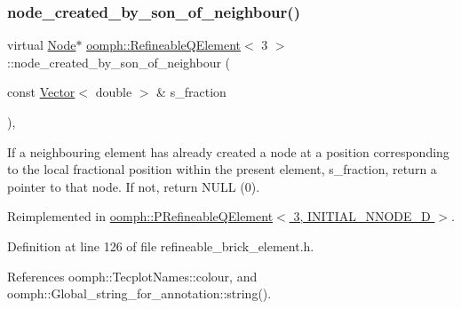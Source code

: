\mbox{\label{classoomph_1_1RefineableQElement_3_013_01_4_aab54b116a277372d4af7d7c93301ecda}} 
\subsubsection{\texorpdfstring{node\+\_\+created\+\_\+by\+\_\+son\+\_\+of\+\_\+neighbour()}{node\_created\_by\_son\_of\_neighbour()}}
{\footnotesize\ttfamily virtual \hyperlink{classoomph_1_1Node}{Node}$\ast$ \hyperlink{classoomph_1_1RefineableQElement}{oomph\+::\+Refineable\+Q\+Element}$<$ 3 $>$\+::node\+\_\+created\+\_\+by\+\_\+son\+\_\+of\+\_\+neighbour (\begin{DoxyParamCaption}\item[{const \hyperlink{classoomph_1_1Vector}{Vector}$<$ double $>$ \&}]{s\+\_\+fraction }\end{DoxyParamCaption})\hspace{0.3cm}{\ttfamily [inline]}, {\ttfamily [virtual]}}



If a neighbouring element has already created a node at a position corresponding to the local fractional position within the present element, s\+\_\+fraction, return a pointer to that node. If not, return N\+U\+LL (0). 



Reimplemented in \hyperlink{classoomph_1_1PRefineableQElement_3_013_00_01INITIAL__NNODE__1D_01_4_aee94f17bdc0cf3de22308e57121866dd}{oomph\+::\+P\+Refineable\+Q\+Element$<$ 3, I\+N\+I\+T\+I\+A\+L\+\_\+\+N\+N\+O\+D\+E\+\_\+D $>$}.



Definition at line 126 of file refineable\+\_\+brick\+\_\+element.\+h.



References oomph\+::\+Tecplot\+Names\+::colour, and oomph\+::\+Global\+\_\+string\+\_\+for\+\_\+annotation\+::string().

\mbox{\label{classoomph_1_1RefineableQElement_3_013_01_4_abde04c6b8616bd2551b24ac1abade563}} 
